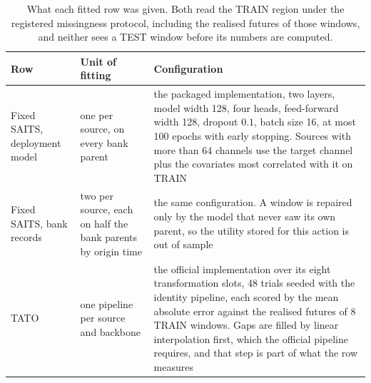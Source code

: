 \documentclass{article}
\begin{document}
\begin{table}[h]
  \caption{What each fitted row was given. Both read the TRAIN region under the registered
  missingness protocol, including the realised futures of those windows, and neither sees a
  TEST window before its numbers are computed.}
  \label{tab:app-baselinecfg}
  \centering
  \small
  \setlength{\tabcolsep}{4pt}
\begin{tabular}{@{}p{} p{} p{}@{}}
    \toprule
    Row & Unit of fitting & Configuration \\
    \midrule
    Fixed SAITS, deployment model & one per source, on every bank parent & the packaged implementation, two layers, model width 128, four heads, feed-forward width 128, dropout $0.1$, batch size 16, at most 100 epochs with early stopping. Sources with more than 64 channels use the target channel plus the covariates most correlated with it on TRAIN \\
    Fixed SAITS, bank records & two per source, each on half the bank parents by origin time & the same configuration. A window is repaired only by the model that never saw its own parent, so the utility stored for this action is out of sample \\
    TATO & one pipeline per source and backbone & the official implementation over its eight transformation slots, 48 trials seeded with the identity pipeline, each scored by the mean absolute error against the realised futures of 8 TRAIN windows. Gaps are filled by linear interpolation first, which the official pipeline requires, and that step is part of what the row measures \\
    \bottomrule
  \end{tabular}
\end{table}
\end{document}
